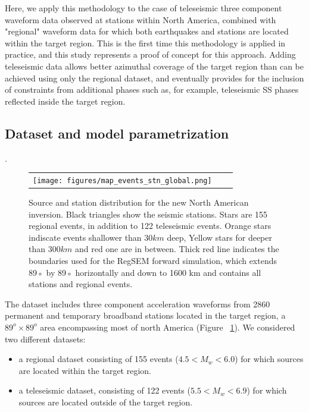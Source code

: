 \documentclass[12pt]{article}
\begin{document}
Here, we apply this methodology to the case of teleseismic three component waveform data observed at stations within North America, combined with "regional" waveform data for which both earthquakes and stations are located within the target region. 
This is the first time this methodology is applied in practice, and this study represents a proof of concept for this approach. 
Adding teleseismic data allows better azimuthal coverage of the target region than can be achieved using only the regional dataset, and eventually provides for the inclusion of constraints from additional phases such as, for example, teleseismic SS phases reflected inside the target region.



\subsection{Dataset and model parametrization}.

\begin{figure}[ht]
	\centering
	\begin{tabular}{ccc}
		\texttt{[image: figures/map\_events\_stn\_global.png]}
	\end{tabular}

	\caption{\baselineskip 18pt 
	Source and station distribution for the new North American inversion. Black triangles show the seismic stations. Stars are 155 regional events, in addition to 122 teleseismic events. Orange stars indiscate events shallower than $30km$ deep, Yellow stars for deeper than $300km$ and red one are in between. Thick red line indicates the boundaries used for the RegSEM forward simulation, which extends 89◦ by 89◦ horizontally and down to 1600 km and contains all stations and regional events.}

	\label{map_evt_stn}
\end{figure}

The dataset includes three component acceleration waveforms from 2860 permanent and temporary broadband stations located in the target region, a $89^o \times 89^o $ area encompassing most of north America (Figure ~\ref{map_evt_stn}). We considered two different datasets:
\begin{itemize}
	\item a regional dataset consisting of 155 events ($4.5 < M_w < 6.0$) for which sources are located within the target region.
	\item a teleseismic dataset, consisting of 122 events ($5.5 <M_w <6.9$) for which sources are located outside of the target region.
\end{itemize}
\end{document}
